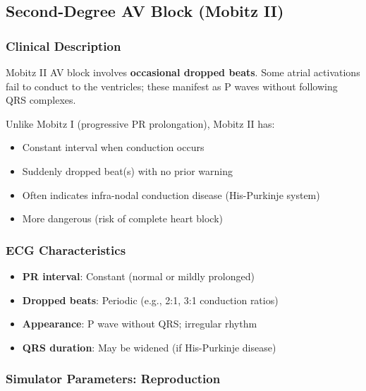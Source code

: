 \documentclass[12pt,a4paper,oneside]{book}
\begin{document}
\subsection{Second-Degree AV Block (Mobitz II)}

\subsubsection{Clinical Description}

Mobitz II AV block involves \textbf{occasional dropped beats}. Some atrial activations fail to conduct to the ventricles; these manifest as P waves without following QRS complexes.

Unlike Mobitz I (progressive PR prolongation), Mobitz II has:

\begin{itemize}
    \item Constant \PR interval when conduction occurs
    \item Suddenly dropped beat(s) with no prior warning
    \item Often indicates infra-nodal conduction disease (His-Purkinje system)
    \item More dangerous (risk of complete heart block)
\end{itemize}

\subsubsection{ECG Characteristics}

\begin{itemize}
    \item \textbf{PR interval}: Constant (normal or mildly prolonged)
    \item \textbf{Dropped beats}: Periodic (e.g., 2:1, 3:1 conduction ratios)
    \item \textbf{Appearance}: P wave without QRS; irregular rhythm
    \item \textbf{QRS duration}: May be widened (if His-Purkinje disease)
\end{itemize}

\subsubsection{Simulator Parameters: Reproduction}
\end{document}
